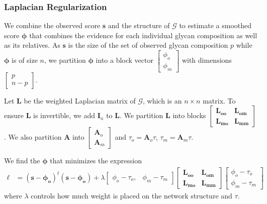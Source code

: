     \subsubsection{Laplacian Regularization}
        We combine the observed score $\mathbf{s}$ and the structure
        of $\mathcal{G}$ to estimate a smoothed score $\mathbf{\phi}$
        that combines the evidence for each individual glycan composition
        as well as its relatives. As $\mathbf{s}$ is the size of the
        set of observed glycan composition $p$ while $\mathbf{\phi}$
        is of size $n$, we partition $\mathbf{\phi}$ into a block
        vector $\begin{bmatrix}\phi_o\\ \phi_m\end{bmatrix}$ with
        dimensions $\begin{bmatrix}p\\ n-p\end{bmatrix}$.

        Let $\mathbf{L}$ be the weighted Laplacian matrix of $\mathcal{G}$,
        which is an $n \times n$ matrix. To ensure $\mathbf{L}$ is
        invertible, we add $\mathbf{I}_n$ to $\mathbf{L}$. We partition
        $\mathbf{L}$ into blocks $\begin{bmatrix} \mathbf{L_{oo}} &
        \mathbf{L_{om}} \\ \mathbf{L_{mo}} & \mathbf{L_{mm}}\end{bmatrix}$.
        We also partition $\mathbf{A}$ into $\begin{bmatrix}\mathbf{A}_o\\
        \mathbf{A}_m\end{bmatrix}$ and $\tau_o = \mathbf{A}_o\tau$,
        $\tau_m = \mathbf{A}_m\tau$.

        We find the $\mathbf{\phi}$ that minimizes the expression
        \begin{align}
            \ell &= (\mathbf{s} - \mathbf{\phi_o})^t(\mathbf{s} - \mathbf{\phi_o}) + \lambda
                \begin{bmatrix}
                    \phi_o - \tau_o, & \phi_m - \tau_m
                \end{bmatrix}
                \begin{bmatrix}
                    \mathbf{L_{oo}} & \mathbf{L_{om}} \\ \mathbf{L_{mo}} & \mathbf{L_{mm}}
                \end{bmatrix}
                \begin{bmatrix}
                    \phi_o - \tau_o \\ \phi_m - \tau_m
                \end{bmatrix} \label{eqn:laplacian_regularization_objective_function}
        \end{align}
        \noindent where $\lambda$ controls how much weight is
        placed on the network structure and $\tau$.

